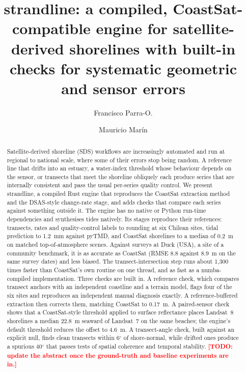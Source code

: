 \documentclass[authoryear,preprint,review,12pt]{elsarticle}
\newcommand{\todo}[1]{\textcolor{red}{\textbf{[TODO: #1]}}}
\begin{document}
\begin{frontmatter}

\title{strandline: a compiled, CoastSat-compatible engine for satellite-derived
shorelines with built-in checks for systematic geometric and sensor errors}

\author[1]{Francisco Parra-O.}

\author[1]{Mauricio Mar\'in}



\begin{abstract}
Satellite-derived shoreline (SDS) workflows are increasingly automated and run
at regional to national scale, where some of their errors stop being random.
A reference line that drifts into an estuary, a water-index threshold whose
behaviour depends on the sensor, or transects that meet the shoreline
obliquely each produce series that are internally consistent and pass the
usual per-series quality control. We present strandline, a compiled Rust
engine that reproduces the CoastSat extraction method and the DSAS-style
change-rate stage, and adds checks that compare each series against something
outside it. The engine has no native or Python run-time dependencies and
synthesises tides natively. Its stages reproduce their references: transects,
rates and quality-control labels to rounding at six Chilean sites, tidal
prediction to 1.2~mm against pyTMD, and CoastSat shorelines to a median of
0.2~m on matched top-of-atmosphere scenes. Against surveys at Duck (USA), a
site of a community benchmark, it is as accurate as CoastSat (RMSE 8.8 against
8.9~m on the same survey dates) and less biased. The transect-intersection step runs about
1,300 times faster than CoastSat's own routine on one thread, and as fast as a
numba-compiled implementation.
Three checks are built in. A reference check, which compares transect anchors
with an independent coastline and a terrain model, flags four of the six sites
and reproduces an independent manual diagnosis exactly. A reference-buffered
extraction then corrects them, matching CoastSat to 0.17~m. A paired-sensor
check shows that a CoastSat-style threshold applied to surface reflectance
places Landsat~8 shorelines a median 22.8~m seaward of Landsat~7 on the same
beaches; the engine's default threshold reduces the offset to 4.6~m. A
transect-angle check, built against an explicit null, finds clean transects
within 6$^\circ$ of shore-normal, while drifted ones produce a spurious
40$^\circ$ that passes tests of spatial coherence and temporal stability.
\todo{update the abstract once the ground-truth and baseline experiments are
in.}
\end{abstract}


\end{frontmatter}
\end{document}
